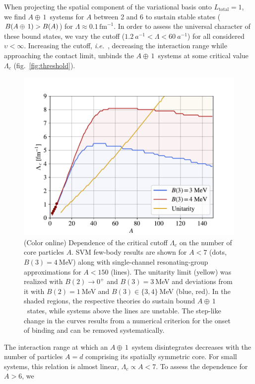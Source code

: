 \documentclass[aps,prl,onecolumn,groupedaddress,superscriptaddress]
{revtex4}
\newcommand{\lc}{\ensuremath{\Lambda_c}}
\newcommand{\fm}{\ensuremath{\,\text{fm}^{-1}}}
\newcommand{\abb}{\mbox{\ensuremath{A\oplus\,1}}}
\newcommand{\ie}{\textit{i.e.}~}
\newcommand{\figref}[1]{fig.~\ref{#1}}
\begin{document}
When projecting the spatial component of the variational basis onto
\mbox{$L_\text{total}=1$}, we find
\abb~systems for $A$
between 2 and 6 to sustain stable states \mbox{($B(\abb)>B(A)$)} for
$\Lambda\approx0.1\fm$.
In order to assess the universal character of these bound states, we vary the
cutoff 
($1.2~a^{-1}<\Lambda<60~a^{-1}$)
for all considered $\upsilon<\infty$.
Increasing the cutoff, \ie, decreasing the interaction range
while approaching the 
contact limit, unbinds the \abb~systems at some critical value $\lc$
(\figref{fig:threshold}).
\begin{figure}
\centering
\includegraphics[width=\linewidth]{./RGM.pdf} 
\caption{(Color online) Dependence of the critical cutoff $\lc$ on the number of core particles
$A$. SVM few-body results are shown for $A<7$ (dots, $B(3)=4~$MeV) along with single-channel resonating-group approximations for $A<150$ (lines). The unitarity limit
(yellow) was realized with $B(2)\to0^+$ and $B(3)=3~$MeV and deviations from it
with $B(2)=1~$MeV and $B(3)\in\lbrace3,4\rbrace~$MeV (blue, red). 
In the shaded regions, the respective theories do sustain bound \abb~states,
while systems above the lines are unstable.
The step-like change in the curves results from a numerical criterion for the onset of binding and
can be removed systematically.}
\label{fig:RGM}
\end{figure}
%
%
The interaction range at which an \abb~system disintegrates
decreases with the number of particles $A=d$ comprising its
spatially symmetric core. For small systems, this relation is
almost linear, $\lc\propto A<7$.
To assess the dependence for $A>6$, we
\end{document}
